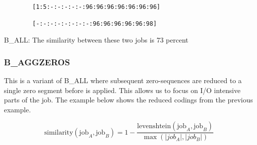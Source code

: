 \documentclass{jhps}
\begin{document}
\begin{listing}
	\noindent\begin{minipage}{0.50\textwidth}
		\begin{lstlisting}
		[1:5:-:-:-:-:-:96:96:96:96:96:96:96]
		\end{lstlisting}
		\vspace{-2em}
		\label{lst:test:a}
	\end{minipage}
	\hfill
	\noindent\begin{minipage}{0.50\textwidth}
		\begin{lstlisting}
		[-:-:-:-:-:-:-:-:96:96:96:96:96:98]
		\end{lstlisting}
		\vspace{-2em}
		\label{lst:test:b}
	\end{minipage}
	\caption{B\_ALL: The similarity between these two jobs is 73 percent}
	\label{lst:test}
\end{listing}


\subsubsection{B\_AGGZEROS}
This is a variant of B\_ALL where subsequent zero-sequences are reduced to a single zero segment before  is applied.
This allows us to focus on I/O intensive parts of the job.
The example below shows the reduced codings from the previous example.

\begin{equation}
	\text{similarity} \left(\text{job}_{A},\text{job}_{B} \right) =1- \frac{\text{levenshtein} \left(\text{job}_{A},\text{job}_{B} \right) }{\max \left( |job_{A}|,|job_{B}| \right) } \label{eq:sim:bin_aggzeros}
\end{equation}

\end{document}
